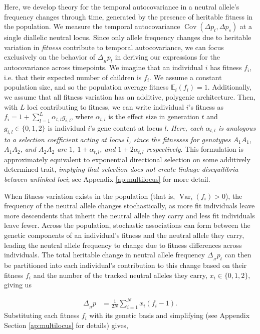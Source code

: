 \documentclass[11pt]{article}
\newcommand{\vb}[1]{{\it \color{blue} #1}}
\newcommand{\E}{\mathbb{E}}
\DeclareMathOperator{\var}{Var}
\DeclareMathOperator{\cov}{Cov}
\begin{document}
Here, we develop theory for the temporal autocovariance in a neutral allele's
frequency changes through time, generated by the presence of heritable fitness
in the population. We measure the temporal autocovariance $\cov(\Delta p_t,
\Delta p_s)$ at a single diallelic neutral locus. Since only allele frequency
changes due to heritable variation in \emph{fitness} contribute to temporal
autocovariance, we can focus exclusively on the behavior of $\Delta_{_H} p_t$
in deriving our expressions for the autocovariance across timepoints. We
imagine that an individual $i$ has fitness $f_i$, i.e. that their expected
number of children is $f_i$. We assume a constant population size, and so the
population average fitness $\E_i(f_i) = 1$. Additionally, we assume that all
fitness variation has an additive, polygenic architecture. Then, with $L$ loci
contributing to fitness, we can write individual $i$'s fitness as $f_i = 1 +
\sum_{l=1}^L \alpha_{t,l} g_{i,l}$, where $\alpha_{t,l}$ is the effect size in
generation $t$ and $g_{i,l} \in \{0, 1, 2\}$ is individual $i$'s gene content
at locus $l$. \vb{Here, each $\alpha_{t,l}$ is analogous to a selection
coefficient acting at locus $l$, since the fitnesses for genotypes $A_1 A_1$,
$A_1 A_2$, and $A_2 A_2$ are $1$, $1 + \alpha_{t,l}$, and $1 + 2\alpha_{t,l}$
respectively}. This formulation is approximately equivalent to exponential
directional selection on some additively determined trait, \vb{implying that
selection does not create linkage disequilibria between unlinked loci}; see
Appendix \ref{ap:multilocus} for more detail.

When fitness variation exists in the population (that is, $\var_i(f_i) > 0$),
the frequency of the neutral allele changes stochastically, as more fit
individuals leave more descendents that inherit the neutral allele they carry
and less fit individuals leave fewer. Across the population, stochastic
associations can form between the genetic components of an individual's fitness
and the neutral allele they carry, leading the neutral allele frequency to
change due to fitness differences across individuals. The total heritable
change in neutral allele frequency $\Delta_{_H} p_t$ can then be partitioned
into each individual's contribution to this change based on their fitness $f_i$
and the number of the tracked neutral alleles they carry, $x_i \in \{0, 1,
2\}$, giving us

\begin{align}
  \Delta_{_H} p &= \frac{1}{2N} \sum_{i=1}^N x_i (f_i - 1).
\end{align}
%
Substituting each fitness $f_i$ with its genetic basis and simplifying (see
Appendix Section \ref{ap:multilocus} for details) gives,
\end{document}
